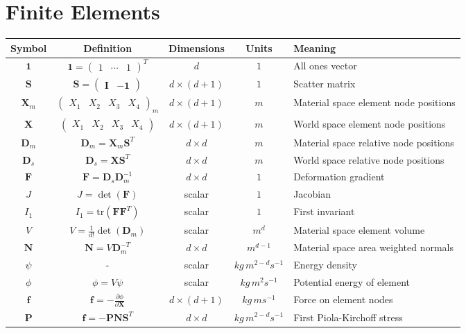 \documentclass{article}
\newcommand{\F}{\mathbf{F}}
\newcommand{\N}{\mathbf{N}}
\renewcommand{\S}{\mathbf{S}}
\newcommand{\D}{\mathbf{D}}
\newcommand{\X}{\mathbf{X}}
\newcommand{\f}{\mathbf{f}}
\renewcommand{\P}{\mathbf{P}}
\newcommand{\Ds}{\D_s}
\newcommand{\Dm}{\D_m}
\renewcommand{\o}{\mathbf{1}}
\newcommand{\I}{\mathbf{I}}
\newcommand{\tr}{\mbox{tr}}
\newcommand{\m}[1]{\begin{pmatrix}#1\end{pmatrix}}
\newcommand{\pp}[2]{\frac{\partial #1}{\partial #2}}
\begin{document}
\section{Finite Elements}

\begin{tabular}{|c|c|cc|l|}
\hline
Symbol & Definition & Dimensions & Units & Meaning \\
\hline
$\o$ & $\o = \m{1 & \cdots & 1}^T$ & $d$ & $1$ & All ones vector \\
$\S$ & $\S = \m{\I & -\o}$ & $d \times (d+1)$ & $1$ & Scatter matrix \\
\hline
$\X_m$ & $\m{X_1 & X_2 & X_3 & X_4}_m$ & $d \times (d+1)$ & $m$ & Material space element node positions \\
$\X$ & $\m{X_1 & X_2 & X_3 & X_4}$ & $d \times (d+1)$ & $m$ & World space element node positions \\
$\Dm$ & $\Dm = \X_m \S^T$ & $d \times d$ & $m$ & Material space relative node positions \\
$\Ds$ & $\Ds = \X \S^T$ & $d \times d$ & $m$ & World space relative node positions \\
$\F$ & $\F = \Ds \Dm^{-1}$ & $d \times d$ & $1$ & Deformation gradient \\
\hline
$J$ & $J = \det(\F)$ & scalar & $1$ & Jacobian \\
$I_1$ & $I_1 = \tr(\F \F^T)$ & scalar & $1$ & First invariant \\
\hline
$V$ & $V = \frac{1}{d!} \det(\Dm)$ & scalar & $m^d$ & Material space element volume \\
$\N$ & $\N = V \Dm^{-T}$ & $d \times d$ & $m^{d-1}$ & Material space area weighted normals \\
\hline
$\psi$ & - & scalar & $kg \, m^{2-d} s^{-1}$ & Energy density \\
$\phi$ & $\phi = V \psi$ & scalar & $kg \, m^2 s^{-1}$ & Potential energy of element \\
$\f$ & $\f = -\pp{\phi}{\X}$ & $d \times (d+1)$ & $kg \, m s^{-1}$ & Force on element nodes \\
$\P$ & $\f = -\P \N \S^T$ & $d \times d$ & $kg \, m^{2-d} s^{-1}$ & First Piola-Kirchoff stress \\
\hline
\end{tabular}
\vspace{.2in}
\end{document}
